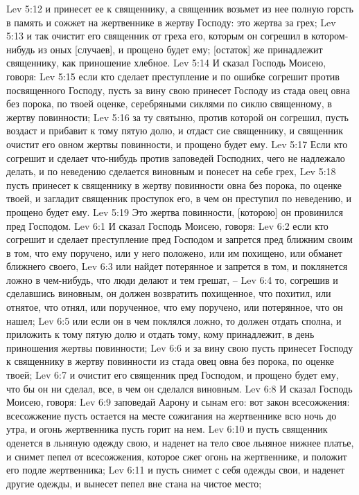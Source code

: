Lev 5:12  и принесет ее к священнику, а священник возьмет из нее полную горсть в память и сожжет на жертвеннике в жертву Господу: это жертва за грех;
Lev 5:13  и так очистит его священник от греха его, которым он согрешил в котором-нибудь из оных [случаев], и прощено будет ему; [остаток] же принадлежит священнику, как приношение хлебное.
Lev 5:14  И сказал Господь Моисею, говоря:
Lev 5:15  если кто сделает преступление и по ошибке согрешит против посвященного Господу, пусть за вину свою принесет Господу из стада овец овна без порока, по твоей оценке, серебряными сиклями по сиклю священному, в жертву повинности;
Lev 5:16  за ту святыню, против которой он согрешил, пусть воздаст и прибавит к тому пятую долю, и отдаст сие священнику, и священник очистит его овном жертвы повинности, и прощено будет ему.
Lev 5:17  Если кто согрешит и сделает что-нибудь против заповедей Господних, чего не надлежало делать, и по неведению сделается виновным и понесет на себе грех,
Lev 5:18  пусть принесет к священнику в жертву повинности овна без порока, по оценке твоей, и загладит священник проступок его, в чем он преступил по неведению, и прощено будет ему.
Lev 5:19  Это жертва повинности, [которою] он провинился пред Господом.
Lev 6:1  И сказал Господь Моисею, говоря:
Lev 6:2  если кто согрешит и сделает преступление пред Господом и запрется пред ближним своим в том, что ему поручено, или у него положено, или им похищено, или обманет ближнего своего,
Lev 6:3  или найдет потерянное и запрется в том, и поклянется ложно в чем-нибудь, что люди делают и тем грешат, --
Lev 6:4  то, согрешив и сделавшись виновным, он должен возвратить похищенное, что похитил, или отнятое, что отнял, или порученное, что ему поручено, или потерянное, что он нашел;
Lev 6:5  или если он в чем поклялся ложно, то должен отдать сполна, и приложить к тому пятую долю и отдать тому, кому принадлежит, в день приношения жертвы повинности;
Lev 6:6  и за вину свою пусть принесет Господу к священнику в жертву повинности из стада овец овна без порока, по оценке твоей;
Lev 6:7  и очистит его священник пред Господом, и прощено будет ему, что бы он ни сделал, все, в чем он сделался виновным.
Lev 6:8  И сказал Господь Моисею, говоря:
Lev 6:9  заповедай Аарону и сынам его: вот закон всесожжения: всесожжение пусть остается на месте сожигания на жертвеннике всю ночь до утра, и огонь жертвенника пусть горит на нем.
Lev 6:10  и пусть священник оденется в льняную одежду свою, и наденет на тело свое льняное нижнее платье, и снимет пепел от всесожжения, которое сжег огонь на жертвеннике, и положит его подле жертвенника;
Lev 6:11  и пусть снимет с себя одежды свои, и наденет другие одежды, и вынесет пепел вне стана на чистое место;

